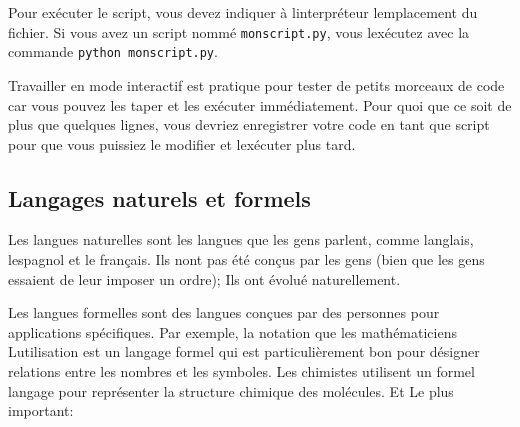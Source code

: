 Pour exécuter le script, vous devez indiquer à
l\textquotesingle interpréteur l\textquotesingle emplacement du fichier.
Si vous avez un script nommé \texttt{monscript.py}, vous
l\textquotesingle exécutez avec la commande
\texttt{python\ monscript.py}.

Travailler en mode interactif est pratique pour tester de petits
morceaux de code car vous pouvez les taper et les exécuter
immédiatement. Pour quoi que ce soit de plus que quelques lignes, vous
devriez enregistrer votre code en tant que script pour que vous puissiez
le modifier et l\textquotesingle exécuter plus tard.

\hypertarget{langages-naturels-et-formels}{%
\subsection{Langages naturels et
formels}\label{langages-naturels-et-formels}}

Les langues naturelles sont les langues que les gens parlent, comme
l\textquotesingle anglais, l\textquotesingle espagnol et le français.
Ils n\textquotesingle ont pas été conçus par les gens (bien que les gens
essaient de leur imposer un ordre); Ils ont évolué naturellement.

Les langues formelles sont des langues conçues par des personnes pour
applications spécifiques. Par exemple, la notation que les
mathématiciens L\textquotesingle utilisation est un langage formel qui
est particulièrement bon pour désigner relations entre les nombres et
les symboles. Les chimistes utilisent un formel langage pour représenter
la structure chimique des molécules. Et Le plus important:
